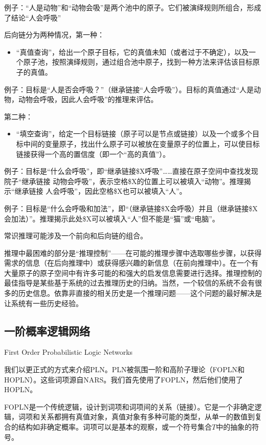 例子：“人是动物”和“动物会吸”是两个池中的原子。它们被演绎规则所组合，形成了结论“人会呼吸”

后向链分为两种情况，第一种：

\begin{itemize}
\item “真值查询”，给出一个原子目标，它的真值未知（或者过于不确定），以及一个原子池，按照演绎规则，通过组合池中原子，找到一种方法来评估该目标原子的真值。
\end{itemize}

例子：目标是“人是否会呼吸？”（继承链接“人会呼吸”）。目标的真值通过“人是动物，动物会呼吸，因此人会呼吸”的推理来评估。

第二种：

\begin{itemize}
\item “填空查询”，给定一个目标链接（原子可以是节点或链接）以及一个或多个目标中间的变量原子，找出什么原子可以被放在变量原子的位置上，可以使目标链接获得一个高的置信度（即一个“高的真值”）。
\end{itemize}

例子：目标是“什么会呼吸”，即“继承链接\$X呼吸”……直接在原子空间中查找发现院子“继承链接 动物会呼吸”，表示空格\$X的位置上可以被填入“动物”。推理揭示“继承链接 人会呼吸”，因此空格\$X也可以被填入“人”。

例子：目标是“什么会呼吸和加法”，即“（继承链接\$X会呼吸）并且（继承链接\$X会加法）”。推理揭示此处\$X可以被填入“人”但不能是“猫”或“电脑”。

常识推理可能涉及一个前向和后向链的组合。

推理中最困难的部分是“推理控制”——在可能的推理步骤中选取哪些步骤，以获得需求的信息（在后向推理中）或获得感兴趣的新信息（在前向推理中）。在一个有大量原子的原子空间中有许多可能的和强大的启发信息需要进行选择。推理控制的最佳指导是某些基于系统的过去推理历史的归纳。当然，一个较信的系统不会有很多的历史信息。依靠非直接的相关历史是一个推理问题——这个问题的最好解决是让系统有一些历史经验。

\subsection{一阶概率逻辑网络}{First Order Probabilistic Logic Networks}

我们以更正式的方式来介绍PLN。PLN被氛围一阶和高阶子理论（FOPLN和HOPLN）。这些词项源自NARS\cite{Wang2006}。我们首先使用了FOPLN，然后他们使用了HOPLN。

FOPLN是一个传统逻辑，设计到词项和词项间的关系（链接）。它是一个非确定逻辑，词项和关系都拥有真值对象，真值对象有多种可能的类型，从单一的数值到复合的结构如非确定概率。词项可以是基本的观察，或一个符号集合$T$中的抽象的符号。

